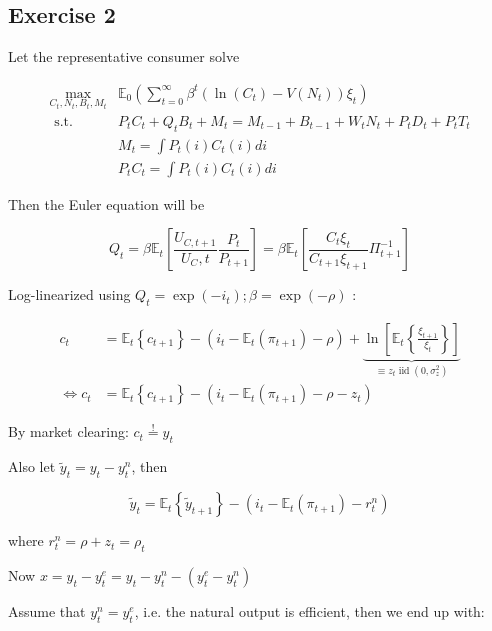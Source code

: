 {
\subsection*{Exercise 2}

\begin{enumerate}[label=(\alph*)]
{\item 
Let the representative consumer solve

$$
\begin{aligned}
\max _{C_t, N_{t}, B_{t}, M_{t}} & \mathbb{E}_{0}\left(\sum_{t=0}^{\infty} \beta^{t}\left(\ln \left(C_{t}\right)-V\left(N_{t}\right)\right) \xi_{t}\right) \\
\text { s.t. } & P_{t} C_{t}+Q_{t} B_{t}+M_{t}=M_{t-1}+B_{t-1}+W_{t} N_{t}+P_{t} D_{t}+P_{t} T_t \\
&M_{t}=\int P_{t}(i) C_{t}(i) d i \\
&P_{t} C_{t}=\int P_{t}(i) C_{t}(i) d i
\end{aligned}
$$

Then the Euler equation will be

$$
Q_{t}=\beta \mathbb{E}_{t}\left[\frac{U_{C, t+1}}{U_{C},t} \frac{P_{t}}{P_{t+1}}\right]=\beta \mathbb{E}_{t}\left[\frac{C_{t} \xi_{t}}{C_{t+1} \xi_{t+1}} \Pi_{t+1}^{-1}\right]
$$

Log-linearized using $Q_{t}=\exp \left(-i_{t}\right) ; \beta=\exp (-\rho)$ :

$$
\begin{aligned}
c_{t} & =\mathbb{E}_{t}\left\{c_{t+1}\right\}-\left(i_{t}-\mathbb{E}_{t}\left(\pi_{t+1}\right)-\rho\right)+\underbrace{\ln \left[\mathbb{E}_{t}\left\{\frac{\xi_{t+1}}{\xi_{t}}\right\}\right]}_{\equiv z_{t} \operatorname{iid}\left(0, \sigma_{z}^{2}\right)} \\
\Leftrightarrow c_{t} & =\mathbb{E}_{t}\left\{c_{t+1}\right\}-\left(i_{t}-\mathbb{E}_{t}\left(\pi_{t+1}\right)-\rho-z_{t}\right)
\end{aligned}
$$

By market clearing: $c_{t} \stackrel{!}{=} y_{t}$

Also let $\tilde{y}_{t}=y_{t} - y_{t}^{n}$, then

$$
\tilde{y}_{t}=\mathbb{E}_{t}\left\{\tilde{y}_{t+1}\right\}-\left(i_{t}-\mathbb{E}_{t}\left(\pi_{t+1}\right)-r_{t}^n\right)
$$

where $r_{t}^{n}=\rho+z_{t}=\rho_{t}$

Now $x=y_{t}-y_{t}^{e}=y_{t}-y_{t}^{n}-\left(y_{t}^{e}-y_{t}^{n}\right)$

Assume that $y_{t}^{n}=y_{t}^{e}$, i.e. the natural output is efficient, then we end up with:

}
\end{enumerate}}

